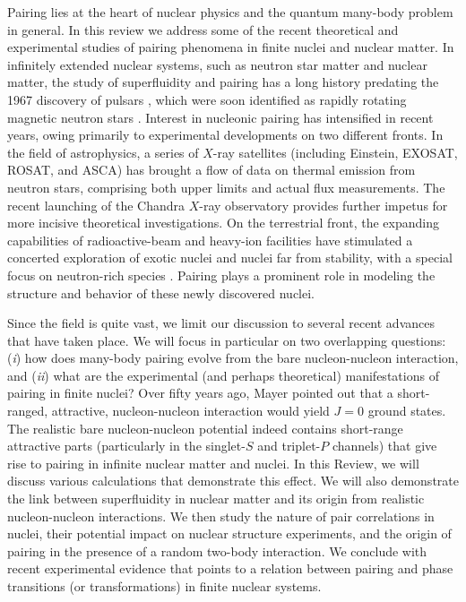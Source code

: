 \documentclass[preprint,rmp,aps,floatfix]{revtex4}
\begin{document}
Pairing lies at the heart of nuclear physics and the quantum
many-body problem in general. In this review we address some
of the recent theoretical and experimental studies of pairing 
phenomena in finite nuclei and nuclear matter. 
In infinitely extended nuclear systems, such as neutron star matter 
and nuclear matter, 
the study of superfluidity and pairing has a 
long history predating the 1967 discovery of pulsars \cite{hewish}, 
which were soon identified as rapidly rotating magnetic neutron 
stars \cite{gold}.  Interest in nucleonic pairing has intensified 
in recent years, owing primarily to experimental developments on two 
different fronts.  In the field of astrophysics, a series of $X$-ray 
satellites (including Einstein, EXOSAT, ROSAT, and ASCA) has brought a 
flow of data on thermal emission from neutron stars, comprising both upper 
limits and actual flux measurements.  The recent launching of the 
Chandra $X$-ray observatory provides further impetus for more incisive 
theoretical investigations.  On the terrestrial 
front, the expanding capabilities of radioactive-beam and heavy-ion 
facilities have stimulated a concerted exploration of exotic nuclei and 
nuclei far from stability, with a special focus on neutron-rich species 
\cite{riisager,mueller}.  Pairing plays a prominent role in modeling 
the structure and behavior of these newly discovered nuclei.  

Since the field
is quite vast, we limit our discussion to several recent 
advances that have taken place. We will
focus in particular on two overlapping questions: ({\it i}) how does
many-body pairing evolve from the bare nucleon-nucleon interaction, and
({\it ii}) what are the experimental (and perhaps theoretical) manifestations
of pairing in finite nuclei?  
Over fifty years ago, 
Mayer \cite{mayer_50} pointed out 
that a short-ranged, attractive, nucleon-nucleon interaction would 
yield $J=0$ ground states. The realistic bare nucleon-nucleon 
potential indeed contains short-range attractive 
parts (particularly in the singlet-$S$ and triplet-$P$ channels)
that give rise to pairing in infinite nuclear matter and nuclei. 
In this Review, we will
discuss various calculations that demonstrate this effect. We will
also demonstrate the link between superfluidity in nuclear matter
and its origin from realistic nucleon-nucleon interactions.
We then study the nature of pair correlations
in nuclei, their potential impact on nuclear structure
experiments, and the origin of pairing
in the presence of a random two-body interaction.
We conclude with recent experimental evidence that 
points to a relation between pairing and 
phase transitions (or transformations) in finite nuclear 
systems. 
\end{document}
